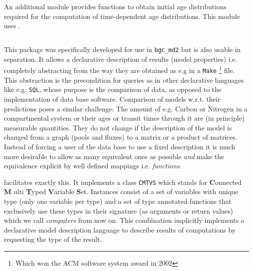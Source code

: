 An additional module provides functions to obtain initial age distributions
required for the computation of time-dependent age distributions. 
This module uses \LAPM{}.

\subsection{\ComputabilityGraphs{}}
This package was specifically developed for use in \texttt{bgc\_md2} but is also usable in separation.
It allows a declarative description of results (model properties) i.e. completely abstracting from the way they are obtained as e.g in a \texttt{Make} 
\footnote{Which won the ACM software system award in 2002} file.  This
abstraction is the precondition for queries as in other declarative languages
like e.g. \texttt{SQL}, whose purpose is the comparison of data, as opposed to
the implementation of data base software.  Comparison of models w.r.t. their
predictions poses a similar challenge: The amount of e.g. Carbon or Nitrogen in
a compartmental system or their ages or transit times through it are (in
principle) measurable quantities. They do not change if the description of the
model is changed from a graph (pools and fluxes) to a matrix or a product of matrices.
Instead of forcing a user of the data base to use a fixed
description it is much more desirable to allow as many equivalent ones as
possible \emph{and} make the equivalence explicit by  well defined mappings i.e. \emph{functions}.

\ComputabilityGraphs{} facilitates exactly this.
It implements a class \texttt{CMTVS} which stands for 
{\bf C}onnected {\bf M} ulti {\bf T}yped {\bf V}ariable {\bf S}et. 
Instances consist of a set of variables with unique type (only one variable per type) and a set of type annotated functions that exclusively 
use these types in their signature (as arguments or return values) which we call \emph{computers} from now on.
This combination implicitly implements a declarative model description language to describe results of computations by requesting the type of the result. 

